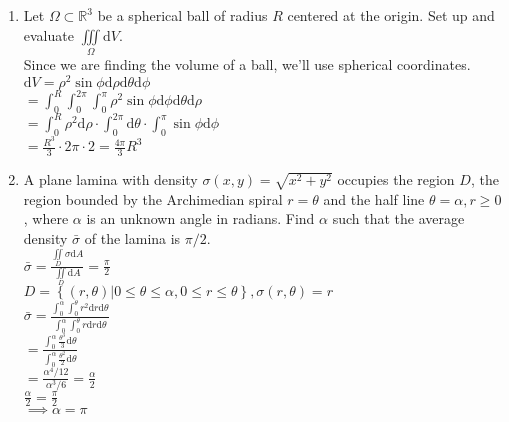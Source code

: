 \begin{enumerate}
	\item Let $\Omega\subset\mathbb{R}^3$ be a spherical ball of radius $R$ centered at the origin. Set up and evaluate $\iiint\limits_{\Omega}{\mathrm{d}V}$.\\
	\indent
	Since we are finding the volume of a ball, we'll use spherical coordinates.\\
	$\mathrm{d}V=\rho^2\sin{\phi}\mathrm{d}\rho\mathrm{d}\theta\mathrm{d}\phi$\\
	$=\int_{0}^{R}{\int_{0}^{2\pi}{\int_{0}^{\pi}{\rho^2\sin{\phi}\mathrm{d}\phi}\mathrm{d}\theta}\mathrm{d}\rho}$\\
	$=\int_{0}^{R}{\rho^2\mathrm{d}\rho}\cdot\int_{0}^{2\pi}{\mathrm{d}\theta}\cdot\int_{0}^{\pi}{\sin{\phi}\mathrm{d}\phi}$\\
	$=\frac{R^3}{3}\cdot 2\pi\cdot 2=\frac{4\pi}{3}R^3$\\
	
	\item A plane lamina with density $\sigma(x,y)=\sqrt{x^2+y^2}$ occupies the region $D$, the region bounded by the Archimedian spiral $r=\theta$ and the half line $\theta=\alpha, r\geq 0$, where $\alpha$ is an unknown angle in radians. Find $\alpha$ such that the average density $\bar{\sigma}$ of the lamina is $\pi/2$.\\
	\indent
	$\bar{\sigma}=\frac{\iint\limits_{D}{\sigma\mathrm{d}A}}{\iint\limits_{D}{\mathrm{d}A}}=\frac{\pi}{2}$\\
	$D=\left\{(r,\theta)|0\leq\theta\leq\alpha,0\leq r\leq\theta\right\},\sigma(r,\theta)=r$\\
	$\bar{\sigma}=\frac{\int_{0}^{\alpha}{\int_{0}^{\theta}{r^2\mathrm{d}r}\mathrm{d}\theta}}{\int_{0}^{\alpha}{\int_{0}^{\theta}{r\mathrm{d}r}\mathrm{d}\theta}}$\\
	$=\frac{\int_{0}^{\alpha}{\frac{\theta^3}{3}\mathrm{d}\theta}}{\int_{0}^{\alpha}{\frac{\theta^2}{2}\mathrm{d}\theta}}$\\
	$=\frac{\alpha^4/12}{\alpha^3/6}=\frac{\alpha}{2}$\\
	$\frac{\alpha}{2}=\frac{\pi}{2}$\\
	$\implies\alpha=\pi$\\
	

\end{enumerate}
